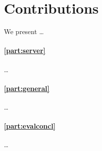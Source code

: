 \section{Contributions}

We present \dots

\paragraph{\cref{part:server}} \dots

\paragraph{\cref{part:general}} \dots

\paragraph{\cref{part:evalconcl}} \dots